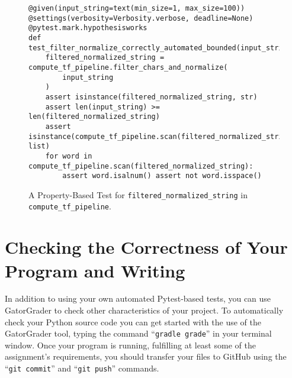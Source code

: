 \documentclass[11pt]{article}
\newcommand{\testprogramsource}{\lstinline{tests/test_compute_tf_pipeline.py}}
\newcommand{\gatorgraderstart}{\command{gradle grade}}
\newcommand{\gitcommit}{\command{git commit}}
\newcommand{\gitpush}{\command{git push}}
\newcommand{\gitcommittestprogram}{\command{git commit tests/test_compute_tf_pipline.py -m "Descriptive commit message"}}
\newcommand{\command}[1]{``\lstinline{#1}''}
\newcommand{\step}[1]{``{#1}''}
\begin{document}
\begin{figure}[t]

  {\footnotesize
    \begin{verbatim}
@given(input_string=text(min_size=1, max_size=100))
@settings(verbosity=Verbosity.verbose, deadline=None)
@pytest.mark.hypothesisworks
def test_filter_normalize_correctly_automated_bounded(input_string):
    filtered_normalized_string = compute_tf_pipeline.filter_chars_and_normalize(
        input_string
    )
    assert isinstance(filtered_normalized_string, str)
    assert len(input_string) >= len(filtered_normalized_string)
    assert isinstance(compute_tf_pipeline.scan(filtered_normalized_string), list)
    for word in compute_tf_pipeline.scan(filtered_normalized_string):
        assert word.isalnum() assert not word.isspace()
    \end{verbatim}
  }
  \vspace*{-.2in}

\caption{A Property-Based Test for {\tt filtered\_normalized\_string} in {\tt
compute\_tf\_pipeline}.}\label{fig:param}

\vspace*{-.1in}

\end{figure}

\section*{Checking the Correctness of Your Program and Writing}

In addition to using your own automated Pytest-based tests, you can use
GatorGrader to check other characteristics of your project. To automatically
check your Python source code you can get started with the use of the
GatorGrader tool, typing the command \gatorgraderstart{} in your terminal
window.
%
Once your program is running, fulfilling at least some of the assignment's
requirements, you should transfer your files to GitHub using the \gitcommit{}
and \gitpush{} commands.


\end{document}
